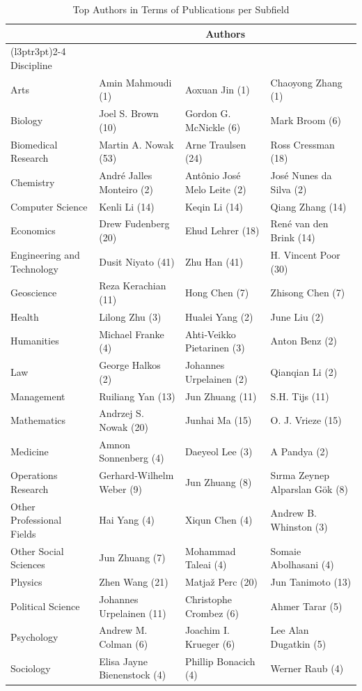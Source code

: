 \documentclass[
  12pt,
]{article}
\begin{document}
\newpage

\begin{table}[H]

\caption{\label{tab:authors per discipline cont}Top Authors in Terms of Publications per Subfield}
\centering
\fontsize{8}{10}\selectfont
\begin{tabular}[t]{llll}
\toprule
\multicolumn{1}{c}{ } & \multicolumn{3}{c}{Authors} \\
\cmidrule(l{3pt}r{3pt}){2-4}
Discipline &  &  & \\
\midrule
Arts & Amin Mahmoudi (1) & Aoxuan Jin (1) & Chaoyong Zhang (1)\\
Biology & Joel S. Brown (10) & Gordon G. McNickle (6) & Mark Broom (6)\\
Biomedical Research & Martin A. Nowak (53) & Arne Traulsen (24) & Ross Cressman (18)\\
Chemistry & André Jalles Monteiro (2) & Antônio José Melo Leite (2) & José Nunes da Silva (2)\\
Computer Science & Kenli Li (14) & Keqin Li (14) & Qiang Zhang (14)\\
Economics & Drew Fudenberg (20) & Ehud Lehrer (18) & René van den Brink (14)\\
Engineering and Technology & Dusit Niyato (41) & Zhu Han (41) & H. Vincent Poor (30)\\
Geoscience & Reza Kerachian (11) & Hong Chen (7) & Zhisong Chen (7)\\
Health & Lilong Zhu (3) & Hualei Yang (2) & June Liu (2)\\
Humanities & Michael Franke (4) & Ahti‐Veikko Pietarinen (3) & Anton Benz (2)\\
Law & George Halkos (2) & Johannes Urpelainen (2) & Qianqian Li (2)\\
Management & Ruiliang Yan (13) & Jun Zhuang (11) & S.H. Tijs (11)\\
Mathematics & Andrzej S. Nowak (20) & Junhai Ma (15) & O. J. Vrieze (15)\\
Medicine & Amnon Sonnenberg (4) & Daeyeol Lee (3) & A Pandya (2)\\
Operations Research & Gerhard‐Wilhelm Weber (9) & Jun Zhuang (8) & Sırma Zeynep Alparslan Gök (8)\\
Other Professional Fields & Hai Yang (4) & Xiqun Chen (4) & Andrew B. Whinston (3)\\
Other Social Sciences & Jun Zhuang (7) & Mohammad Taleai (4) & Somaie Abolhasani (4)\\
Physics & Zhen Wang (21) & Matjaž Perc (20) & Jun Tanimoto (13)\\
Political Science & Johannes Urpelainen (11) & Christophe Crombez (6) & Ahmer Tarar (5)\\
Psychology & Andrew M. Colman (6) & Joachim I. Krueger (6) & Lee Alan Dugatkin (5)\\
Sociology & Elisa Jayne Bienenstock (4) & Phillip Bonacich (4) & Werner Raub (4)\\
\bottomrule
\end{tabular}
\end{table}
\end{document}

